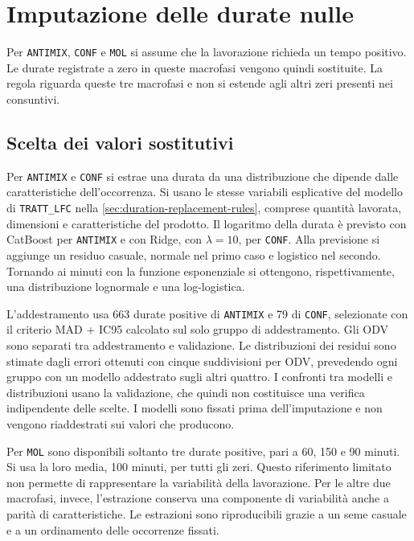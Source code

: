 \section{Imputazione delle durate nulle}
\label{sec:zero-duration-imputation}

Per \texttt{ANTIMIX}, \texttt{CONF} e \texttt{MOL} si assume che la lavorazione richieda un tempo positivo. Le durate registrate a zero in queste macrofasi vengono quindi sostituite. La regola riguarda queste tre macrofasi e non si estende agli altri zeri presenti nei consuntivi.

\subsection{Scelta dei valori sostitutivi}
\label{sec:zero-duration-models}

Per \texttt{ANTIMIX} e \texttt{CONF} si estrae una durata da una distribuzione che dipende dalle caratteristiche dell'occorrenza. Si usano le stesse variabili esplicative del modello di \texttt{TRATT\_LFC} nella \cref{sec:duration-replacement-rules}, comprese quantità lavorata, dimensioni e caratteristiche del prodotto. Il logaritmo della durata è previsto con CatBoost per \texttt{ANTIMIX} e con Ridge, con $\lambda=10$, per \texttt{CONF}. Alla previsione si aggiunge un residuo casuale, normale nel primo caso e logistico nel secondo. Tornando ai minuti con la funzione esponenziale si ottengono, rispettivamente, una distribuzione lognormale e una log-logistica.

L'addestramento usa 663 durate positive di \texttt{ANTIMIX} e 79 di \texttt{CONF}, selezionate con il criterio MAD + IC95 calcolato sul solo gruppo di addestramento. Gli ODV sono separati tra addestramento e validazione. Le distribuzioni dei residui sono stimate dagli errori ottenuti con cinque suddivisioni per ODV, prevedendo ogni gruppo con un modello addestrato sugli altri quattro. I confronti tra modelli e distribuzioni usano la validazione, che quindi non costituisce una verifica indipendente delle scelte. I modelli sono fissati prima dell'imputazione e non vengono riaddestrati sui valori che producono.

Per \texttt{MOL} sono disponibili soltanto tre durate positive, pari a 60, 150 e 90 minuti. Si usa la loro media, 100 minuti, per tutti gli zeri. Questo riferimento limitato non permette di rappresentare la variabilità della lavorazione. Per le altre due macrofasi, invece, l'estrazione conserva una componente di variabilità anche a parità di caratteristiche. Le estrazioni sono riproducibili grazie a un seme casuale e a un ordinamento delle occorrenze fissati.

